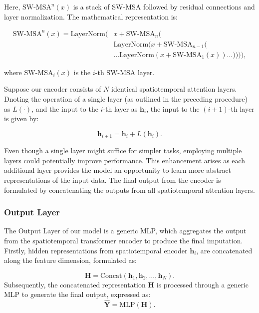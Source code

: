 \documentclass[11pt]{article}
\begin{document}
Here, $\text{SW-MSA}^n(x)$ is a stack of SW-MSA followed by residual connections and layer normalization. The mathematical representation is: 


\begin{align}
\text{SW-MSA}^n(x) = \text{LayerNorm}(&x + \text{SW-MSA}_{n}( \\
&\text{LayerNorm}(x + \text{SW-MSA}_{n-1}( \\
&\ldots \text{LayerNorm}(x + \text{SW-MSA}_{1}(x))\ldots )))),
\end{align}

where $\text{SW-MSA}_i(x)$ is the $i$-th SW-MSA layer. 

Suppose our encoder consists of $N$ identical spatiotemporal attention layers. Dnoting the operation of a single layer (as outlined in the preceding procedure) as $L(\cdot)$, and the input to the $i$-th layer as $\boldsymbol{h}_i$, the input to the $(i+1)$-th layer is given by:

\begin{equation}
    \boldsymbol{h}_{i+1} = \boldsymbol{h}_i + L(\boldsymbol{h}_i).
\end{equation}

Even though a single layer might suffice for simpler tasks, employing multiple layers could potentially improve performance. This enhancement arises as each additional layer provides the model an opportunity to learn more abstract representations of the input data. The final output from the encoder is formulated by concatenating the outputs from all spatiotemporal attention layers.

\subsubsection*{Output Layer}

The Output Layer of our model is a generic MLP, which aggregates the output from the spatiotemporal transformer encoder to produce the final imputation. Firstly, hidden representations from spatiotemporal encoder $\boldsymbol{h}_i$, are concatenated along the feature dimension, formulated as:

\begin{equation}
\boldsymbol{H} = \text{Concat}(\boldsymbol{h}_1, \boldsymbol{h}_2, \ldots, \boldsymbol{h}_N).\end{equation}
Subsequently, the concatenated representation $\boldsymbol{H}$ is processed through a generic MLP to generate the final output, expressed as:
\begin{equation}
\hat{\boldsymbol{Y}} = \text{MLP}(\boldsymbol{H}).
\end{equation}
\end{document}
